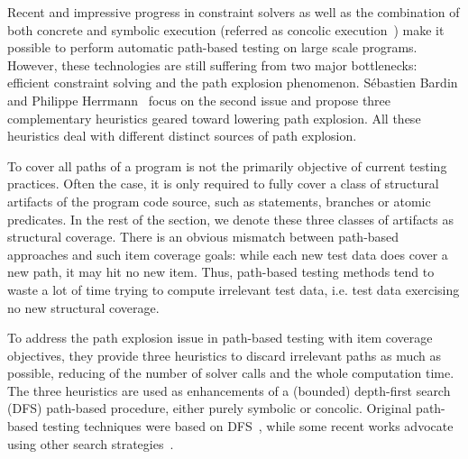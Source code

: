 Recent and impressive progress in constraint solvers as well as the combination of both concrete and symbolic execution (referred as concolic execution~\cite{cute,dart}) make it possible to perform automatic path-based testing on large scale programs. However, these technologies are still suffering from two major bottlenecks: efficient constraint solving and the path explosion phenomenon. S\'{e}bastien Bardin and Philippe Herrmann~\cite{prune} focus on the second issue and propose three complementary heuristics geared toward lowering path explosion. All these heuristics deal with different distinct sources of path explosion. 

To cover all paths of a program is not the primarily objective of current testing practices. Often the case, it is only required to fully cover a class of structural artifacts of the program code source, such as statements, branches or atomic predicates. In the rest of the section, we denote these three classes of artifacts as structural coverage. There is an obvious mismatch between path-based approaches and such item coverage goals: while each new test data does cover a new path, it may hit no new item. Thus, path-based testing methods tend to waste a lot of time trying to compute irrelevant test data, i.e. test data exercising no new structural coverage. 

To address the path explosion issue in path-based testing with item coverage objectives, they provide three heuristics to discard irrelevant paths as much as possible, reducing of the number of solver calls and the whole computation time. The three heuristics are used as enhancements of a (bounded) depth-first search (DFS) path-based procedure, either purely symbolic or concolic. Original path-based testing techniques were based on DFS~\cite{dart,cute, onthefly}, while some recent works advocate using other search strategies~\cite{exe,hybrid,fuzz}.

